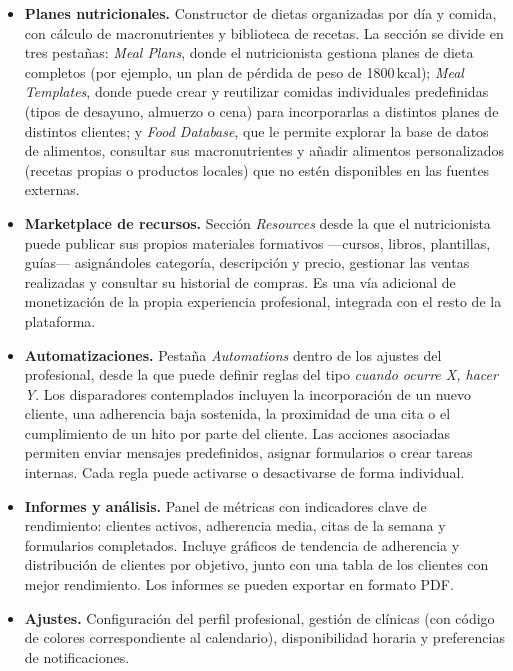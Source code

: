 \begin{itemize}
    \item \textbf{Planes nutricionales.} Constructor de dietas organizadas por día y comida, con cálculo de macronutrientes y biblioteca de recetas. La sección se divide en tres pestañas: \textit{Meal Plans}, donde el nutricionista gestiona planes de dieta completos (por ejemplo, un plan de pérdida de peso de 1800\,kcal); \textit{Meal Templates}, donde puede crear y reutilizar comidas individuales predefinidas (tipos de desayuno, almuerzo o cena) para incorporarlas a distintos planes de distintos clientes; y \textit{Food Database}, que le permite explorar la base de datos de alimentos, consultar sus macronutrientes y añadir alimentos personalizados (recetas propias o productos locales) que no estén disponibles en las fuentes externas.

    \item \textbf{Marketplace de recursos.} Sección \textit{Resources} desde la que el nutricionista puede publicar sus propios materiales formativos ---cursos, libros, plantillas, guías--- asignándoles categoría, descripción y precio, gestionar las ventas realizadas y consultar su historial de compras. Es una vía adicional de monetización de la propia experiencia profesional, integrada con el resto de la plataforma.

    \item \textbf{Automatizaciones.} Pestaña \textit{Automations} dentro de los ajustes del profesional, desde la que puede definir reglas del tipo \textit{cuando ocurre X, hacer Y}. Los disparadores contemplados incluyen la incorporación de un nuevo cliente, una adherencia baja sostenida, la proximidad de una cita o el cumplimiento de un hito por parte del cliente. Las acciones asociadas permiten enviar mensajes predefinidos, asignar formularios o crear tareas internas. Cada regla puede activarse o desactivarse de forma individual.

    \item \textbf{Informes y análisis.} Panel de métricas con indicadores clave de rendimiento: clientes activos, adherencia media, citas de la semana y formularios completados. Incluye gráficos de tendencia de adherencia y distribución de clientes por objetivo, junto con una tabla de los clientes con mejor rendimiento. Los informes se pueden exportar en formato PDF.

    \item \textbf{Ajustes.} Configuración del perfil profesional, gestión de clínicas (con código de colores correspondiente al calendario), disponibilidad horaria y preferencias de notificaciones.
\end{itemize}

